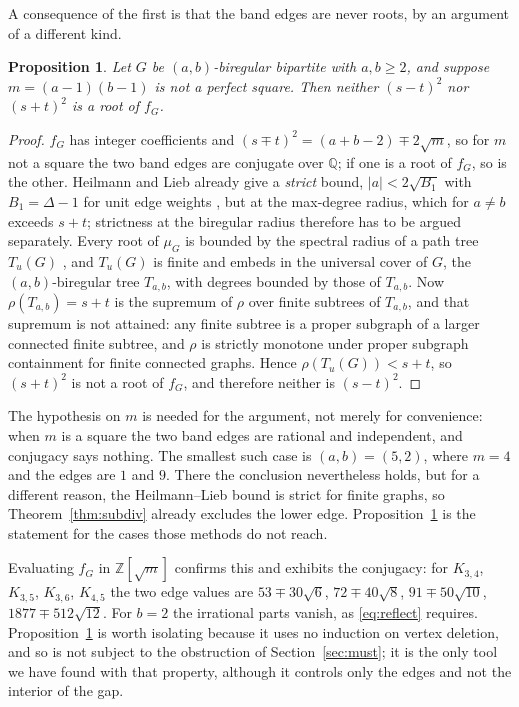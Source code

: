 \documentclass[11pt]{article}
\newtheorem{proposition}[theorem]{Proposition}
\theoremstyle{remark}
\begin{document}
A consequence of the first is that the band edges are never roots, by an
argument of a different kind.

\begin{proposition}\label{prop:galois}
Let $G$ be $(a,b)$-biregular bipartite with $a,b\ge2$, and suppose
$m=(a-1)(b-1)$ is not a perfect square. Then neither $(s-t)^2$ nor $(s+t)^2$ is
a root of $f_G$.
\end{proposition}

\begin{proof}
$f_G$ has integer coefficients and $(s\mp t)^2=(a+b-2)\mp2\sqrt m$, so for $m$
not a square the two band edges are conjugate over $\mathbb Q$; if one is a root
of $f_G$, so is the other. Heilmann and Lieb already give a \emph{strict} bound,
$|a|<2\sqrt{B_1}$ with $B_1=\Delta-1$ for unit edge weights \cite[Thm.~4.3]{HL},
but at the max-degree radius, which for $a\ne b$ exceeds $s+t$; strictness at the
biregular radius therefore has to be argued separately. Every root of $\mu_G$ is
bounded by the spectral
radius of a path tree $T_u(G)$ \cite{Go}, and $T_u(G)$ is finite and embeds
in the universal cover of $G$, the $(a,b)$-biregular tree $T_{a,b}$, with
degrees bounded by those of $T_{a,b}$. Now $\rho(T_{a,b})=s+t$ is the supremum
of $\rho$ over finite subtrees of $T_{a,b}$, and that supremum is not attained:
any finite subtree is a proper subgraph of a larger connected finite subtree,
and $\rho$ is strictly monotone under proper subgraph containment for finite
connected graphs. Hence $\rho(T_u(G))<s+t$, so $(s+t)^2$ is not a root of
$f_G$, and therefore neither is $(s-t)^2$.
\end{proof}

The hypothesis on $m$ is needed for the argument, not merely for convenience:
when $m$ is a square the two band edges are rational and independent, and
conjugacy says nothing. The smallest such case is $(a,b)=(5,2)$, where $m=4$
and the edges are $1$ and $9$. There the conclusion nevertheless holds, but for
a different reason, the Heilmann--Lieb bound is strict for finite graphs, so
Theorem~\ref{thm:subdiv} already excludes the lower edge. Proposition~\ref{prop:galois}
is the statement for the cases those methods do not reach.

Evaluating $f_G$ in $\mathbb Z[\sqrt m]$ confirms this and exhibits the
conjugacy: for $K_{3,4}$, $K_{3,5}$, $K_{3,6}$, $K_{4,5}$ the two edge values
are $53\mp30\sqrt6$, $72\mp40\sqrt8$, $91\mp50\sqrt{10}$, $1877\mp512\sqrt{12}$.
For $b=2$ the irrational parts vanish, as \eqref{eq:reflect} requires.
Proposition~\ref{prop:galois} is worth isolating because it uses no induction on
vertex deletion, and so is not subject to the obstruction of
Section~\ref{sec:must}; it is
the only tool we have found with that property, although it controls only the
edges and not the interior of the gap.
\end{document}
